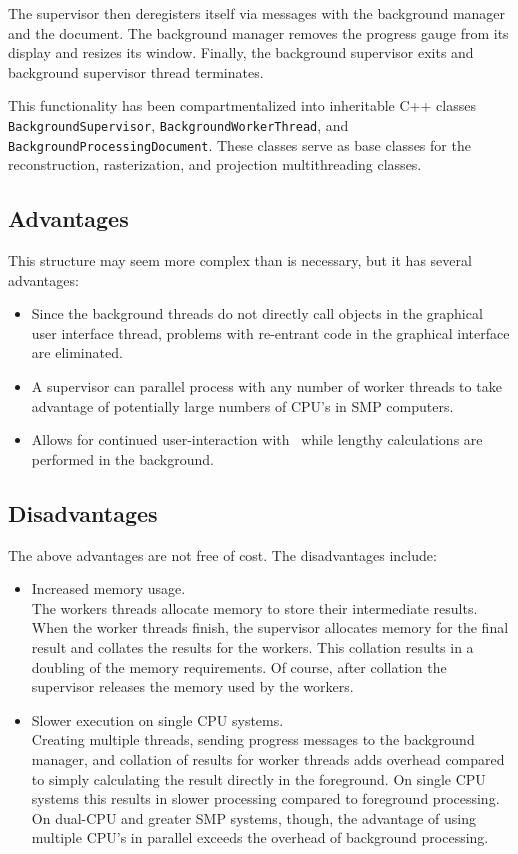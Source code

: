 The supervisor then deregisters itself via messages with the
background manager and the document. The background manager
removes the progress gauge from its display and resizes its
window. Finally, the background supervisor exits and background
supervisor thread terminates.

This functionality has been compartmentalized into inheritable C++
classes \texttt{BackgroundSupervisor},
\texttt{BackgroundWorkerThread}, and
\texttt{BackgroundProcessingDocument}. These classes serve as base
classes for the reconstruction, rasterization, and projection
multithreading classes.

\subsection{Advantages}
This structure may seem more complex than is necessary, but it has
several advantages:

\begin{itemize}
\item Since the background threads do not directly call objects in the graphical
user interface thread, problems with re-entrant code in the
graphical interface are eliminated.
\item A supervisor can parallel process with any number of worker threads
to take advantage of potentially large numbers of CPU's in SMP
computers.
\item Allows for continued user-interaction with \ctsim\ while lengthy calculations
are performed in the background.
\end{itemize}

\subsection{Disadvantages}

The above advantages are not free of cost. The disadvantages
include:

\begin{itemize}
\item Increased memory usage.\\
 The workers threads allocate memory to store their intermediate
results. When the worker threads finish, the supervisor allocates
memory for the final result and collates the results for the
workers. This collation results in a doubling of the memory
requirements. Of course, after collation the supervisor releases
the memory used by the workers.
\item Slower execution on single CPU systems. \\
Creating multiple threads, sending progress messages to the
background manager, and collation of results for worker threads
adds overhead compared to simply calculating the result directly
in the foreground. On single CPU systems this results in slower
processing compared to foreground processing. On dual-CPU and
greater SMP systems, though, the advantage of using multiple CPU's
in parallel exceeds the overhead of background processing.
\end{itemize}
